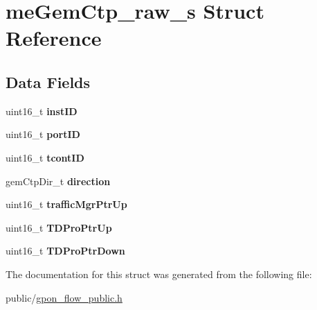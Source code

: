 \hypertarget{structmeGemCtp__raw__s}{}\section{me\+Gem\+Ctp\+\_\+raw\+\_\+s Struct Reference}
\label{structmeGemCtp__raw__s}
\subsection*{Data Fields}
\begin{DoxyCompactItemize}
\item 
\mbox{\label{structmeGemCtp__raw__s_a0e8cee59704cdc237c33408a9b5fa8a5}} 
uint16\+\_\+t {\bfseries inst\+ID}
\item 
\mbox{\label{structmeGemCtp__raw__s_a74f94c49e788ce9e98c16238ffd5b0b2}} 
uint16\+\_\+t {\bfseries port\+ID}
\item 
\mbox{\label{structmeGemCtp__raw__s_ab43016869b6f2b1424aac07427a31417}} 
uint16\+\_\+t {\bfseries tcont\+ID}
\item 
\mbox{\label{structmeGemCtp__raw__s_a85b7293a65d9bdf8428b46e386c0e764}} 
gem\+Ctp\+Dir\+\_\+t {\bfseries direction}
\item 
\mbox{\label{structmeGemCtp__raw__s_ad3cf970257b002a07ef9e1b50fc12d18}} 
uint16\+\_\+t {\bfseries traffic\+Mgr\+Ptr\+Up}
\item 
\mbox{\label{structmeGemCtp__raw__s_add30a3db4d3d638a8b6b02cca42f9045}} 
uint16\+\_\+t {\bfseries T\+D\+Pro\+Ptr\+Up}
\item 
\mbox{\label{structmeGemCtp__raw__s_a2cd6ec23d750560f5b02ed53f15f93fb}} 
uint16\+\_\+t {\bfseries T\+D\+Pro\+Ptr\+Down}
\end{DoxyCompactItemize}


The documentation for this struct was generated from the following file\+:\begin{DoxyCompactItemize}
\item 
public/\hyperlink{gpon__flow__public_8h}{gpon\+\_\+flow\+\_\+public.\+h}\end{DoxyCompactItemize}
